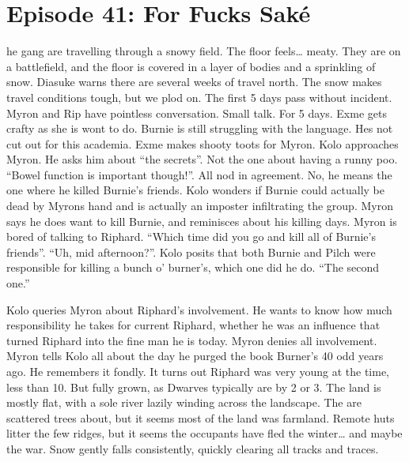 \section{Episode 41: For Fucks Saké}

\begin{multicols}{2}

he gang are travelling through a snowy field. The floor feels… meaty. They are on a battlefield, and the floor is covered in a layer of bodies and a sprinkling of snow. Diasuke warns there are several weeks of travel north. The snow makes travel conditions tough, but we plod on. The first 5 days pass without incident. Myron and Rip have pointless conversation. Small talk. For 5 days. Exme gets crafty as she is wont to do. Burnie is still struggling with the language. Hes not cut out for this academia. Exme makes shooty toots for Myron. Kolo approaches Myron. He asks him about “the secrets”. Not the one about having a runny poo. “Bowel function is important though!”. All nod in agreement. No, he means the one where he killed Burnie’s friends. Kolo wonders if Burnie could actually be dead by Myrons hand and is actually an imposter infiltrating the group. Myron says he does want to kill Burnie, and reminisces about his killing days. Myron is bored of talking to Riphard. “Which time did you go and kill all of Burnie’s friends”. “Uh, mid afternoon?”. Kolo posits that both Burnie and Pilch were responsible for killing a bunch o’ burner’s, which one did he do. “The second one.”\medskip

Kolo queries Myron about Riphard’s involvement. He wants to know how much responsibility he takes for current Riphard, whether he was an influence that turned Riphard into the fine man he is today. Myron denies all involvement. Myron tells Kolo all about the day he purged the book Burner’s 40 odd years ago. He remembers it fondly. It turns out Riphard was very young at the time, less than 10. But fully grown, as Dwarves typically are by 2 or 3. The land is mostly flat, with a sole river lazily winding across the landscape. The are scattered trees about, but it seems most of the land was farmland. Remote huts litter the few ridges, but it seems the occupants have fled the winter… and maybe the war. Snow gently falls consistently, quickly clearing all tracks and traces.\medskip


\end{multicols}
